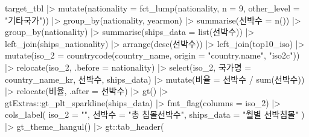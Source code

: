 \documentclass[
  letterpaper,
  chapter,a4paper,showtrims,openright,hidelinks]{oblivoir}
\newenvironment{Shaded}{\begin{snugshade}}{\end{snugshade}}
\newcommand{\AttributeTok}[1]{\textcolor[rgb]{0.40,0.45,0.13}{#1}}
\newcommand{\DecValTok}[1]{\textcolor[rgb]{0.68,0.00,0.00}{#1}}
\newcommand{\FunctionTok}[1]{\textcolor[rgb]{0.28,0.35,0.67}{#1}}
\newcommand{\NormalTok}[1]{\textcolor[rgb]{0.00,0.23,0.31}{#1}}
\newcommand{\OtherTok}[1]{\textcolor[rgb]{0.00,0.23,0.31}{#1}}
\newcommand{\SpecialCharTok}[1]{\textcolor[rgb]{0.37,0.37,0.37}{#1}}
\newcommand{\StringTok}[1]{\textcolor[rgb]{0.13,0.47,0.30}{#1}}
\begin{document}
\begin{Shaded}
\begin{Highlighting}[]
\NormalTok{target\_tbl }\SpecialCharTok{|\textgreater{}} 
  \FunctionTok{mutate}\NormalTok{(}\AttributeTok{nationality =} \FunctionTok{fct\_lump}\NormalTok{(nationality, }\AttributeTok{n =} \DecValTok{9}\NormalTok{, }\AttributeTok{other\_level =} \StringTok{"기타국가"}\NormalTok{)) }\SpecialCharTok{|\textgreater{}} 
  \FunctionTok{group\_by}\NormalTok{(nationality, yearmon) }\SpecialCharTok{|\textgreater{}} 
  \FunctionTok{summarise}\NormalTok{(선박수 }\OtherTok{=} \FunctionTok{n}\NormalTok{()) }\SpecialCharTok{|\textgreater{}} 
  \FunctionTok{group\_by}\NormalTok{(nationality) }\SpecialCharTok{|\textgreater{}} 
  \FunctionTok{summarise}\NormalTok{(}\AttributeTok{ships\_data =} \FunctionTok{list}\NormalTok{(선박수)) }\SpecialCharTok{|\textgreater{}}  
  \FunctionTok{left\_join}\NormalTok{(ships\_nationality) }\SpecialCharTok{|\textgreater{}} 
  \FunctionTok{arrange}\NormalTok{(}\FunctionTok{desc}\NormalTok{(선박수)) }\SpecialCharTok{|\textgreater{}} 
  \FunctionTok{left\_join}\NormalTok{(top10\_iso) }\SpecialCharTok{|\textgreater{}} 
  \FunctionTok{mutate}\NormalTok{(}\AttributeTok{iso\_2 =} \FunctionTok{countrycode}\NormalTok{(country\_name, }\AttributeTok{origin =} \StringTok{"country.name"}\NormalTok{, }\StringTok{"iso2c"}\NormalTok{)) }\SpecialCharTok{|\textgreater{}} 
  \FunctionTok{relocate}\NormalTok{(iso\_2, }\AttributeTok{.before =}\NormalTok{ nationality) }\SpecialCharTok{|\textgreater{}} 
  \FunctionTok{select}\NormalTok{(iso\_2, 국가명 }\OtherTok{=}\NormalTok{ country\_name\_kr, 선박수, ships\_data) }\SpecialCharTok{|\textgreater{}} 
  \FunctionTok{mutate}\NormalTok{(비율 }\OtherTok{=}\NormalTok{ 선박수 }\SpecialCharTok{/} \FunctionTok{sum}\NormalTok{(선박수)) }\SpecialCharTok{|\textgreater{}} 
  \FunctionTok{relocate}\NormalTok{(비율, }\AttributeTok{.after =}\NormalTok{ 선박수) }\SpecialCharTok{|\textgreater{}} 
  \FunctionTok{gt}\NormalTok{() }\SpecialCharTok{|\textgreater{}} 
\NormalTok{    gtExtras}\SpecialCharTok{::}\FunctionTok{gt\_plt\_sparkline}\NormalTok{(ships\_data) }\SpecialCharTok{|\textgreater{}} 
    \FunctionTok{fmt\_flag}\NormalTok{(}\AttributeTok{columns =}\NormalTok{ iso\_2) }\SpecialCharTok{|\textgreater{}} 
    \FunctionTok{cols\_label}\NormalTok{(}
      \AttributeTok{iso\_2 =} \StringTok{""}\NormalTok{,}
\NormalTok{      선박수 }\OtherTok{=} \StringTok{"총 침몰선박수"}\NormalTok{,}
      \AttributeTok{ships\_data =} \StringTok{"월별 선박침몰"}
\NormalTok{    )  }\SpecialCharTok{|\textgreater{}} 
    \FunctionTok{gt\_theme\_hangul}\NormalTok{() }\SpecialCharTok{|\textgreater{}} 
\NormalTok{    gt}\SpecialCharTok{::}\FunctionTok{tab\_header}\NormalTok{(}

\end{Highlighting}
\end{Shaded}
\end{document}
